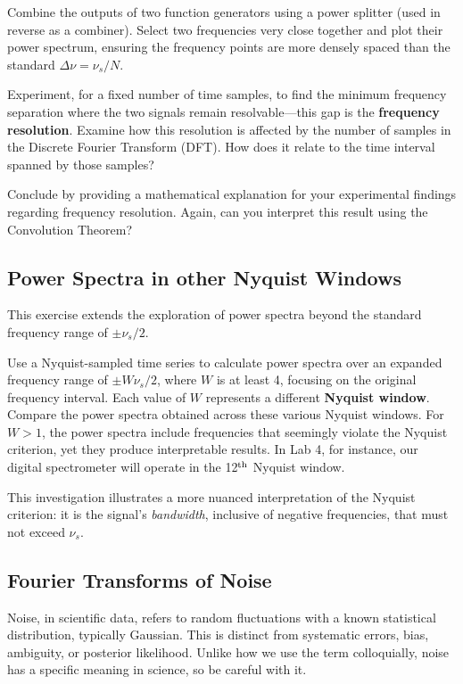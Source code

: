 \documentclass[11pt,preprint]{aastex}
\begin{document}
Combine the outputs of two function generators using a power splitter (used in reverse as a combiner). Select two frequencies very close together and plot their power spectrum, ensuring the frequency points are more densely spaced than the standard $\Delta \nu = \nu_s/N$.

Experiment, for a fixed number of time samples, to find the minimum frequency separation where the two signals remain resolvable---this gap is the \textbf{frequency resolution}. Examine how this resolution is affected by the number of samples in the Discrete Fourier Transform (DFT). How does it relate to the time interval spanned by those samples?

Conclude by providing a mathematical explanation for your experimental findings regarding frequency resolution.
Again, can you interpret this result using the Convolution Theorem?


\subsection{Power Spectra in other Nyquist Windows}

\noindent
This exercise extends the exploration of power spectra beyond the standard frequency range of $\pm \nu_s/2$. 

Use a Nyquist-sampled time series to calculate power spectra over an expanded frequency range of $\pm W \nu_s/2$, where $W$ is at least 4, focusing on the original frequency interval.
Each value of $W$ represents a different \textbf{ Nyquist window}.
Compare the power spectra obtained across these various Nyquist windows.
For $W > 1$, the power spectra include frequencies that seemingly violate the Nyquist criterion, yet they produce interpretable results. In Lab 4, for instance, our digital spectrometer will operate in the 12$^{\rm th}$ Nyquist window.

This investigation illustrates a more nuanced interpretation of the Nyquist criterion: it is the signal's {\it bandwidth}, inclusive of negative frequencies, that must not exceed $\nu_s$.


\subsection{Fourier Transforms of Noise}

\noindent
Noise, in scientific data, refers to random fluctuations with a known statistical distribution, typically Gaussian.
This is distinct from systematic errors, bias, ambiguity, or posterior likelihood.
Unlike how we use the term colloquially, noise has a specific meaning in science, so be careful with it.
\end{document}
